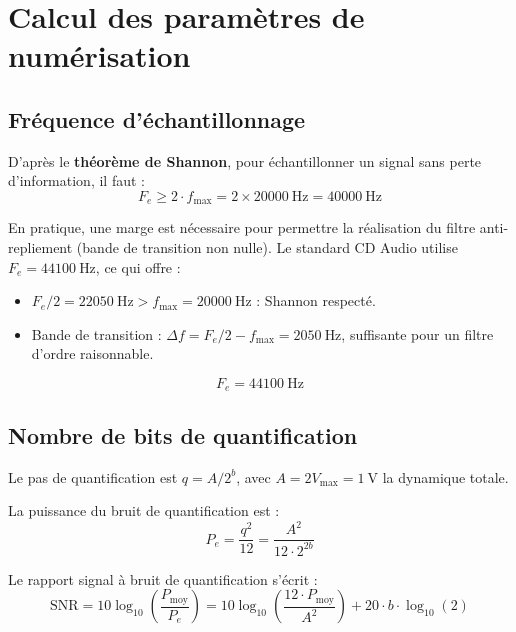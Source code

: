 \documentclass[12pt, a4paper, french]{article}
\newcommand{\Fe}{F_e}
\newcommand{\fmax}{f_{\text{max}}}
\newcommand{\SNR}{\text{SNR}}
\begin{document}
\section{Calcul des paramètres de numérisation}
\label{sec:parametres}

\subsection{Fréquence d'échantillonnage}

D'après le \textbf{théorème de Shannon}, pour échantillonner un signal sans perte d'information, il faut :
\begin{equation}
    \Fe \geq 2 \cdot \fmax = 2 \times \SI{20000}{\hertz} = \SI{40000}{\hertz}
    \label{eq:shannon}
\end{equation}

En pratique, une marge est nécessaire pour permettre la réalisation du filtre anti-repliement (bande de transition non nulle). Le standard CD Audio utilise $\Fe = \SI{44100}{\hertz}$, ce qui offre :
\begin{itemize}
    \item $\Fe/2 = \SI{22050}{\hertz} > \fmax = \SI{20000}{\hertz}$ : Shannon respecté.
    \item Bande de transition : $\Delta f = \Fe/2 - \fmax = \SI{2050}{\hertz}$, suffisante pour un filtre d'ordre raisonnable.
\end{itemize}

\begin{equation}
    \boxed{\Fe = \SI{44100}{\hertz}}
\end{equation}

\subsection{Nombre de bits de quantification}

Le pas de quantification est $q = A / 2^b$, avec $A = 2 V_{\text{max}} = \SI{1}{\volt}$ la dynamique totale.

La puissance du bruit de quantification est :
\begin{equation}
    P_e = \frac{q^2}{12} = \frac{A^2}{12 \cdot 2^{2b}}
    \label{eq:pe}
\end{equation}

Le rapport signal à bruit de quantification s'écrit :
\begin{equation}
    \SNR = 10 \log_{10}\left(\frac{P_{\text{moy}}}{P_e}\right) = 10 \log_{10}\left(\frac{12 \cdot P_{\text{moy}}}{A^2}\right) + 20 \cdot b \cdot \log_{10}(2)
    \label{eq:snr}
\end{equation}
\end{document}
